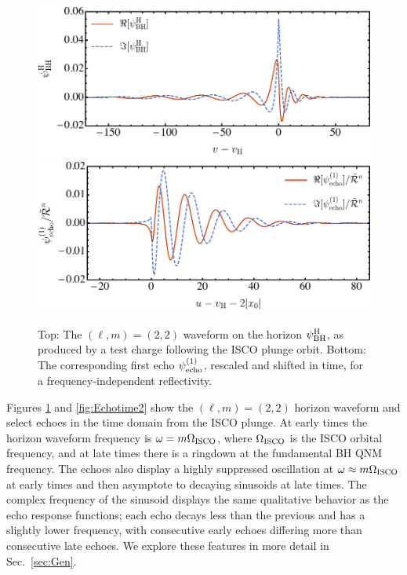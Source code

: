 \begin{refsection}
\begin{figure}[t]
\includegraphics[width = 1 \columnwidth]{chapter_echo/etc/PsiHTD.pdf}\\
\includegraphics[width = 1 \columnwidth]{chapter_echo/etc/Echo1TD.pdf}
\caption{
Top: The $(\ell,m)=(2,2)$ waveform on the horizon $\psi_{\rm BH}^{\rm H}$, as produced by a test charge following the ISCO plunge orbit.
Bottom: The corresponding first echo $\psi_{\rm echo}^{(1)}$, rescaled and shifted in time, for a frequency-independent reflectivity.
}
\label{fig:Echotime}
\end{figure}

Figures \ref{fig:Echotime} and \ref{fig:Echotime2} show the $(\ell,m)=(2,2)$ horizon waveform and select echoes in the time domain from the ISCO plunge.
At early times the horizon waveform frequency is $\omega=m\Omega_{\rm ISCO}$, where $\Omega_{\rm ISCO}$ is the ISCO orbital frequency, and at late times there is a ringdown at the fundamental BH QNM frequency. 
The echoes also display a highly suppressed oscillation at $\omega \approx m\Omega_{\rm ISCO}$ at early times and then asymptote to decaying sinusoids at late times. 
The complex frequency of the sinusoid displays the same qualitative behavior as the echo response functions; each echo decays less than the previous and has a slightly lower frequency, with consecutive early echoes differing more than consecutive late echoes. We explore these features in more detail in Sec.~\ref{sec:Gen}.


\end{refsection}
